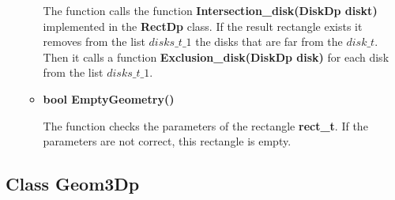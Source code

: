 \documentclass{report}
\begin{document}
\begin{itemize}
\begin{itemize}
			The function calls the function {\bfseries Intersection\_disk(DiskDp diskt)}  implemented in the {\bfseries RectDp} class.
			If the result rectangle exists it removes from the list $disks\_t\_1$ the disks that are far from the  $disk\_t$.
			Then it calls a function {\bfseries  Exclusion\_disk(DiskDp disk)} for each disk from the list  $disks\_t\_1$.
		
			\item {\bfseries bool EmptyGeometry()}
		
			The function checks the parameters of the rectangle {\bfseries rect\_t}. If the parameters are not correct, this rectangle is empty. 
		\end{itemize}
	\end{itemize}


	\subsection*{Class Geom3Dp}
\label{Geom3Dp}
\end{document}
